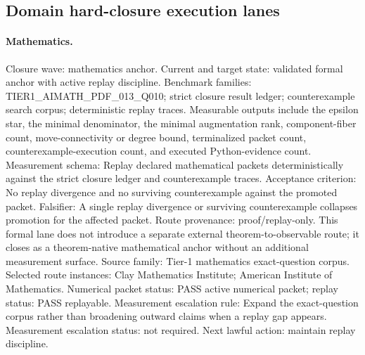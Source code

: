 \subsection{Domain hard-closure execution lanes}
\paragraph{Mathematics.}
Closure wave: mathematics anchor. Current and target state: validated formal anchor with active replay discipline.
Benchmark families: TIER1\_AIMATH\_PDF\_013\_Q010; strict closure result ledger; counterexample search corpus; deterministic replay traces.
Measurable outputs include the epsilon star, the minimal denominator, the
minimal augmentation rank, component-fiber count, move-connectivity or degree
bound, terminalized packet count, counterexample-execution count, and executed
Python-evidence count.
Measurement schema: Replay declared mathematical packets deterministically against the strict closure ledger and counterexample traces.
Acceptance criterion: No replay divergence and no surviving counterexample against the promoted packet.
Falsifier: A single replay divergence or surviving counterexample collapses promotion for the affected packet.
Route provenance: proof/replay-only. This formal lane does not introduce a separate external theorem-to-observable route; it closes as a theorem-native mathematical anchor without an additional measurement surface. Source family: Tier-1 mathematics exact-question corpus.
Selected route instances: Clay Mathematics Institute; American Institute of Mathematics.
Numerical packet status: PASS active numerical packet; replay status: PASS replayable.
Measurement escalation rule: Expand the exact-question corpus rather than broadening outward claims when a replay gap appears.
Measurement escalation status: not required.
Next lawful action: maintain replay discipline.

